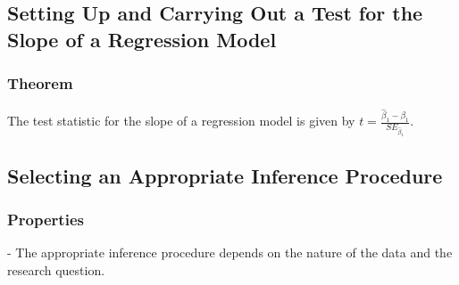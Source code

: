 \subsection{Setting Up and Carrying Out a Test for the Slope of a Regression Model}
\subsubsection{Theorem}
\begin{theorem}
The test statistic for the slope of a regression model is given by \( t = \frac{\hat{\beta}_1 - \beta_1}{SE_{\hat{\beta}_1}} \).
\end{theorem}

\subsection{Selecting an Appropriate Inference Procedure}
\subsubsection{Properties}
\begin{properties}
- The appropriate inference procedure depends on the nature of the data and the research question.
\end{properties}


